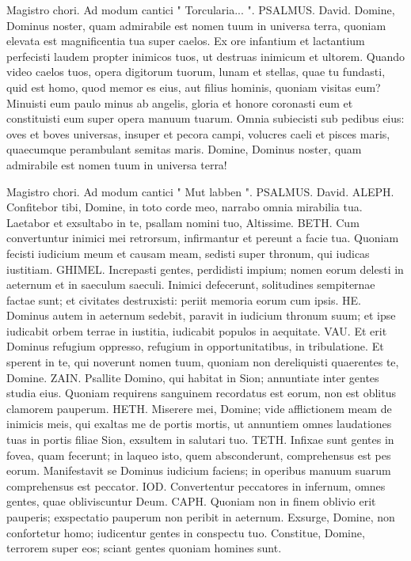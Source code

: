 \begin{biblechapter}  
\verse  Magistro chori. Ad modum cantici " Torcularia... ". PSALMUS. David. 
\verse Domine, Dominus noster, quam admirabile est nomen tuum in universa terra, quoniam elevata est magnificentia tua super caelos. 
\verse Ex ore infantium et lactantium perfecisti laudem propter inimicos tuos, ut destruas inimicum et ultorem. 
\verse Quando video caelos tuos, opera digitorum tuorum, lunam et stellas, quae tu fundasti, 
\verse quid est homo, quod memor es eius, aut filius hominis, quoniam visitas eum? 
\verse Minuisti eum paulo minus ab angelis, gloria et honore coronasti eum 
\verse et constituisti eum super opera manuum tuarum. Omnia subiecisti sub pedibus eius: 
\verse oves et boves universas, insuper et pecora campi, 
\verse volucres caeli et pisces maris, quaecumque perambulant semitas maris. 
\verse Domine, Dominus noster, quam admirabile est nomen tuum in universa terra! 
\end{biblechapter}

\begin{biblechapter}  
\verse  Magistro chori. Ad modum cantici " Mut labben ". PSALMUS. David. 
\verse ALEPH. Confitebor tibi, Domine, in toto corde meo, narrabo omnia mirabilia tua. 
\verse Laetabor et exsultabo in te, psallam nomini tuo, Altissime. 
\verse BETH. Cum convertuntur inimici mei retrorsum, infirmantur et pereunt a facie tua. 
\verse Quoniam fecisti iudicium meum et causam meam, sedisti super thronum, qui iudicas iustitiam. 
\verse GHIMEL. Increpasti gentes, perdidisti impium; nomen eorum delesti in aeternum et in saeculum saeculi. 
\verse Inimici defecerunt, solitudines sempiternae factae sunt; et civitates destruxisti: periit memoria eorum cum ipsis. 
\verse HE. Dominus autem in aeternum sedebit, paravit in iudicium thronum suum; 
\verse et ipse iudicabit orbem terrae in iustitia, iudicabit populos in aequitate. 
\verse VAU. Et erit Dominus refugium oppresso, refugium in opportunitatibus, in tribulatione. 
\verse Et sperent in te, qui noverunt nomen tuum, quoniam non dereliquisti quaerentes te, Domine. 
\verse ZAIN. Psallite Domino, qui habitat in Sion; annuntiate inter gentes studia eius. 
\verse Quoniam requirens sanguinem recordatus est eorum, non est oblitus clamorem pauperum. 
\verse HETH. Miserere mei, Domine; vide afflictionem meam de inimicis meis, qui exaltas me de portis mortis, 
\verse ut annuntiem omnes laudationes tuas in portis filiae Sion, exsultem in salutari tuo. 
\verse TETH. Infixae sunt gentes in fovea, quam fecerunt; in laqueo isto, quem absconderunt, comprehensus est pes eorum. 
\verse Manifestavit se Dominus iudicium faciens; in operibus manuum suarum comprehensus est peccator. 
\verse IOD. Convertentur peccatores in infernum, omnes gentes, quae obliviscuntur Deum. 
\verse CAPH. Quoniam non in finem oblivio erit pauperis; exspectatio pauperum non peribit in aeternum. 
\verse Exsurge, Domine, non confortetur homo; iudicentur gentes in conspectu tuo. 
\verse Constitue, Domine, terrorem super eos; sciant gentes quoniam homines sunt. 
\end{biblechapter}

